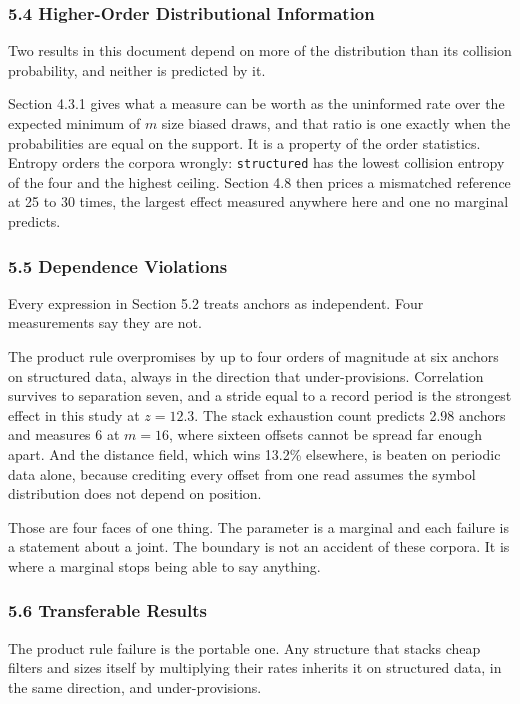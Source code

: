 \subsubsection{5.4 Higher-Order Distributional Information}

Two results in this document depend on more of the distribution than its collision probability, and neither is predicted by it.

Section 4.3.1 gives what a measure can be worth as the uninformed rate over the expected minimum of \(m\) size biased draws, and that ratio is one exactly when the probabilities are equal on the support. It is a property of the order statistics. Entropy orders the corpora wrongly: \texttt{structured} has the lowest collision entropy of the four and the highest ceiling. Section 4.8 then prices a mismatched reference at 25 to 30 times, the largest effect measured anywhere here and one no marginal predicts.

\subsubsection{5.5 Dependence Violations}

Every expression in Section 5.2 treats anchors as independent. Four measurements say they are not.

The product rule overpromises by up to four orders of magnitude at six anchors on structured data, always in the direction that under-provisions. Correlation survives to separation seven, and a stride equal to a record period is the strongest effect in this study at \(z = 12.3\). The stack exhaustion count predicts 2.98 anchors and measures 6 at \(m = 16\), where sixteen offsets cannot be spread far enough apart. And the distance field, which wins 13.2\% elsewhere, is beaten on periodic data alone, because crediting every offset from one read assumes the symbol distribution does not depend on position.

Those are four faces of one thing. The parameter is a marginal and each failure is a statement about a joint. The boundary is not an accident of these corpora. It is where a marginal stops being able to say anything.

\subsubsection{5.6 Transferable Results}

The product rule failure is the portable one. Any structure that stacks cheap filters and sizes itself by multiplying their rates inherits it on structured data, in the same direction, and under-provisions.

